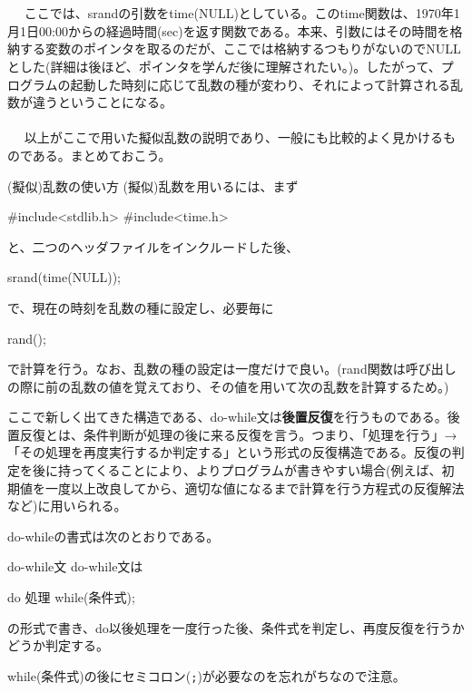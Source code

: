 \\ \\　
ここでは、srandの引数をtime(NULL)としている。このtime関数は、1970年1月1日00:00からの経過時間(sec)を返す関数である。本来、引数にはその時間を格納する変数のポインタを取るのだが、ここでは格納するつもりがないのでNULLとした(詳細は後ほど、ポインタを学んだ後に理解されたい。)。したがって、プログラムの起動した時刻に応じて乱数の種が変わり、それによって計算される乱数が違うということになる。
\\ \\　
以上がここで用いた擬似乱数の説明であり、一般にも比較的よく見かけるものである。まとめておこう。
\begin{itembox}[l]{(擬似)乱数の使い方}
(擬似)乱数を用いるには、まず
\begin{code}
#include<stdlib.h>
#include<time.h>
\end{code}
と、二つのヘッダファイルをインクルードした後、
\begin{code}
srand(time(NULL));
\end{code}
で、現在の時刻を乱数の種に設定し、必要毎に
\begin{code}
rand();
\end{code}
で計算を行う。なお、乱数の種の設定は一度だけで良い。(rand関数は呼び出しの際に前の乱数の値を覚えており、その値を用いて次の乱数を計算するため。)
\end{itembox}
ここで新しく出てきた構造である、do-while文は\textbf{後置反復}を行うものである。後置反復とは、条件判断が処理の後に来る反復を言う。つまり、「処理を行う」→「その処理を再度実行するか判定する」という形式の反復構造である。反復の判定を後に持ってくることにより、よりプログラムが書きやすい場合(例えば、初期値を一度以上改良してから、適切な値になるまで計算を行う方程式の反復解法など)に用いられる。

do-whileの書式は次のとおりである。
\begin{itembox}[l]{do-while文}
do-while文は
\begin{code}
do{
  処理
}while(条件式);
\end{code}
の形式で書き、do以後処理を一度行った後、条件式を判定し、再度反復を行うかどうか判定する。

while(条件式)の後にセミコロン(\verb|;|)が必要なのを忘れがちなので注意。
\end{itembox}

